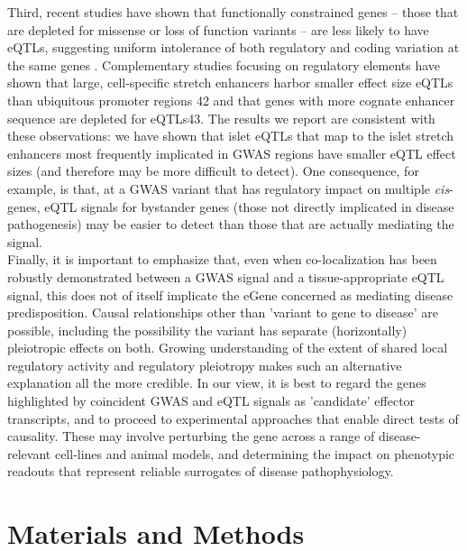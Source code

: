 Third, recent studies have shown that functionally constrained genes – those that are depleted for missense or loss of function variants – are less likely to have eQTLs, suggesting uniform intolerance of both regulatory and coding variation at the same genes \cite{lekAnalysisProteincodingGenetic2016, glassbergEvidenceWeakSelective2019}. Complementary studies focusing on regulatory elements have shown that large, cell-specific stretch enhancers harbor smaller effect size eQTLs than ubiquitous promoter regions 42 and that genes with more cognate enhancer sequence are depleted for eQTLs43. The results we report are consistent with these observations: we have shown that islet eQTLs that map to the islet stretch enhancers most frequently implicated in GWAS regions have smaller eQTL effect sizes (and therefore may be more difficult to detect). One consequence, for example, is that, at a GWAS variant that has regulatory impact on multiple \textit{cis}-genes, eQTL signals for bystander genes (those not directly implicated in disease pathogenesis) may be easier to detect than those that are actually mediating the signal. \\

Finally, it is important to emphasize that, even when co-localization has been robustly demonstrated between a GWAS signal and a tissue-appropriate eQTL signal, this does not of itself implicate the eGene concerned as mediating disease predisposition. Causal relationships other than 'variant to gene to disease' are possible, including the possibility the variant has separate (horizontally) pleiotropic effects on both. Growing understanding of the extent of shared local regulatory activity and regulatory pleiotropy makes such an alternative explanation all the more credible. In our view, it is best to regard the genes highlighted by coincident GWAS and eQTL signals as 'candidate' effector transcripts, and to proceed to experimental approaches that enable direct tests of causality. These may involve perturbing the gene across a range of disease-relevant cell-lines and animal models, and determining the impact on phenotypic readouts that represent reliable surrogates of disease pathophysiology. 


\section{Materials and Methods}

